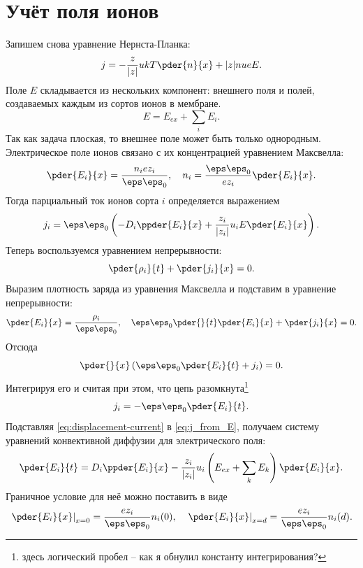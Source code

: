 \documentclass{hedwork}
\begin{document}
\section{Учёт поля ионов}
    Запишем снова уравнение Нернста-Планка:
    \begin{equation}
        j = -\frac{z}{|z|}ukT\pder{n}{x} + |z|nueE.
    \end{equation}
    Поле \( E \) складывается из нескольких компонент: внешнего поля и полей,
    создаваемых каждым из сортов ионов в мембране.
    \begin{equation}
        E = E_{ex} + \sum_{i} E_i.
    \end{equation}
    Так как задача плоская, то внешнее поле может быть только однородным.
    Электрическое поле ионов связано с их концентрацией уравнением Максвелла:
    \begin{equation}
        \pder{E_i}{x} = \frac{n_iez_i}{\eps\eps_0},\quad
        n_i = \frac{\eps\eps_0}{ez_i}\pder{E_i}{x}.
    \end{equation}
    Тогда парциальный ток ионов сорта \( i \) определяется выражением
    \begin{equation}
        j_i = \eps\eps_0
            \left(-D_i\ppder{E_i}{x}+\frac{z_i}{|z_i|}u_iE\pder{E_i}{x}\right).
        \label{eq:j_from_E}
    \end{equation}
    Теперь воспользуемся уравнением непрерывности:
    \begin{equation}
        \pder{\rho_i}{t} + \pder{j_i}{x} = 0.
    \end{equation}
    Выразим плотность заряда из уравнения Максвелла и подставим в уравнение
    непрерывности:
    \begin{equation}
        \pder{E_i}{x} = \frac{\rho_i}{\eps\eps_0},\quad
        \eps\eps_0\pder{}{t}\pder{E_i}{x} + \pder{j_i}{x} = 0.
    \end{equation}
    Отсюда
    \begin{equation}
        \pder{}{x}\left(\eps\eps_0\pder{E_i}{t} + j_i\right) = 0.
    \end{equation}
    Интегрируя его и считая при этом, что цепь разомкнута\footnote{здесь
    логический пробел -- как я обнулил константу интегрирования?}
    \begin{equation}
        j_i = -\eps\eps_0\pder{E_i}{t}.
        \label{eq:displacement-current}
    \end{equation}
    Подставляя \eqref{eq:displacement-current} в \eqref{eq:j_from_E}, получаем
    систему уравнений конвективной диффузии для электрического поля:
    \begin{equation}
        \pder{E_i}{t} = D_i\ppder{E_i}{x} -
        \frac{z_i}{|z_i|}u_i\left(E_{ex} + \sum_{k} E_k\right)\pder{E_i}{x}.
    \end{equation}
    Граничное условие для неё можно поставить в виде
    \begin{equation}
        \left.\pder{E_i}{x}\right|_{x=0} = \frac{ez_i}{\eps\eps_0}n_i(0),\quad
        \left.\pder{E_i}{x}\right|_{x=d} = \frac{ez_i}{\eps\eps_0}n_i(d).
    \end{equation}
\end{document}
